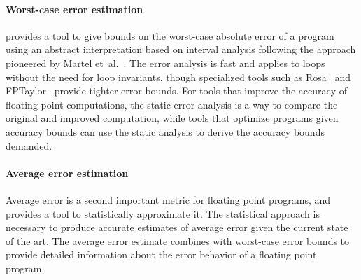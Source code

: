 \documentclass[main.tex]{subfiles}
\begin{document}
\paragraph{Worst-case error estimation}
\name provides a tool to give bounds on
  the worst-case absolute error of a \core program
  using an abstract interpretation based on interval analysis
  following the approach pioneered by Martel et~al.~\cite{martel-ai}.
The error analysis is fast
  and applies to loops without the need for loop invariants,
  though specialized tools such as Rosa~\cite{DarulovaK14}
  and FPTaylor~\cite{fptaylor-fm15}
  provide tighter error bounds.
For tools that improve the accuracy of floating point computations,
  the static error analysis is a way to compare
  the original and improved computation,
  while tools that optimize programs given accuracy bounds
  can use the static analysis to derive the accuracy bounds demanded.

\paragraph{Average error estimation}
Average error is a second important metric for floating point programs,
  and \name provides a tool to statistically approximate it.
The statistical approach is necessary to produce accurate estimates
  of average error given the current state of the art.
The average error estimate combines with worst-case error bounds
  to provide detailed information about the error behavior
  of a floating point program.
\end{document}
